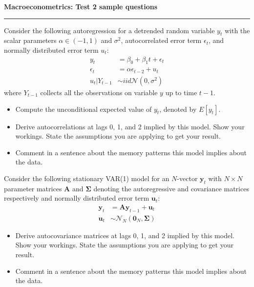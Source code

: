 \documentclass[12pt]{article}
\begin{document}
\bigskip\noindent\textbf{\LARGE Macroeconometrics: Test 2 sample questions}


\smallskip\noindent\rule{5cm}{.1pt}

\normalsize

\begin{adjustwidth}{1cm}{1cm}

\begin{description}
\bigskip\item[Exercise 1.] Consider the following autoregression for a detrended random variable $y_t$ with the scalar parameters $\alpha\in(-1,1)$ and $\sigma^2$, autocorrelated error term $\epsilon_t$, and normally distributed error term $u_t$:
\begin{align}
y_t &= \beta_0 + \beta_1 t + \epsilon_t\\
\epsilon_t &= \alpha \epsilon_{t-2} + u_t\\
u_t | Y_{t-1} &\sim iid\mathcal{N}\left(0, \sigma^2\right)
\end{align}
where $Y_{t-1}$ collects all the observations on variable $y$ up to time $t-1$.

\begin{itemize}
\item Compute the unconditional expected value of $y_t$, denoted by $E[y_t]$.
\item Derive autocorrelations at lags 0, 1, and 2 implied by this model. Show your workings. State the assumptions you are applying to get your result.
\item Comment in a sentence about the memory patterns this model implies about the data.
\end{itemize}


\bigskip\item[Exercise 2.] Consider the following stationary VAR(1) model for an $N$-vector $\mathbf{y}_t$ with $N\times N$ parameter matrices $\mathbf{A}$ and $\mathbf{\Sigma}$ denoting the autoregressive and covariance matrices respectively and normally distributed error term $\mathbf{u}_t$:
\begin{align}
\mathbf{y}_t &= \mathbf{A} \mathbf{y}_{t-1} + \mathbf{u}_t\\
\mathbf{u}_t &\sim\mathcal{N}_N(\mathbf{0}_N, \mathbf{\Sigma})
\end{align}
\begin{itemize}
\item Derive autocovariance matrices at lags 0, 1, and 2 implied by this model. Show your workings. State the assumptions you are applying to get your result.
\item Comment in a sentence about the memory patterns this model implies about the data.
\end{itemize}



\end{description}
\end{adjustwidth}
\end{document}
